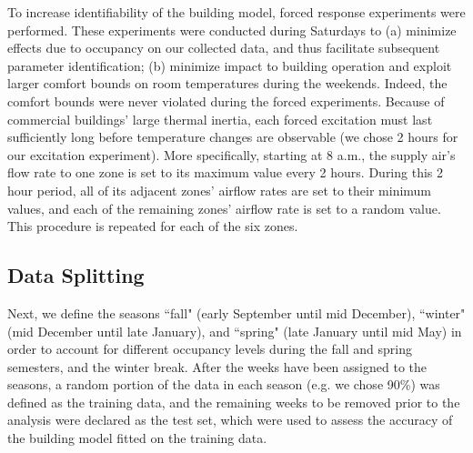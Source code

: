 To increase identifiability of the building model, forced response experiments were performed. These experiments were conducted during Saturdays to (a) minimize effects due to occupancy on our collected data, and thus facilitate subsequent parameter identification; (b) minimize impact to building operation and exploit larger comfort bounds on room temperatures during the weekends. Indeed, the comfort bounds were never violated during the forced experiments. 
Because of commercial buildings' large thermal inertia, each forced excitation must last sufficiently long before temperature changes are observable (we chose 2 hours for our excitation experiment).
More specifically, starting at 8 a.m., the supply air's flow rate to one zone is set to its maximum value every 2 hours. During this 2 hour period, all of its adjacent zones' airflow rates are set to their minimum values, and each of the remaining zones' airflow rate is set to a random value. 
This procedure is repeated for each of the six zones. 



\subsection{Data Splitting}
Next, we define the seasons ``fall" (early September until mid December), ``winter" (mid December until late January), and ``spring" (late January until mid May) in order to account for different occupancy levels during the fall and spring semesters, and the winter break. After the weeks have been assigned to the seasons, a random portion of the data in each season (e.g. we chose 90\%) was defined as the training data, and the remaining weeks to be removed prior to the analysis were declared as the test set, which were used to assess the accuracy of the building model fitted on the training data.

